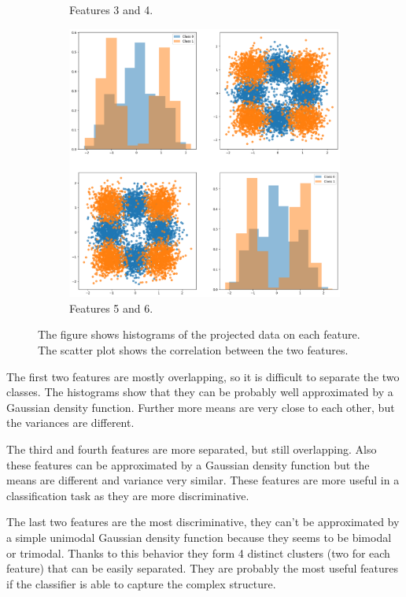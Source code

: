 \documentclass{article}
\begin{document}
\begin{figure}[ht]
\begin{subfigure}[b]{0.3\textwidth}
        \caption{Features 3 and 4.}
    \end{subfigure}
    \hfill
    \begin{subfigure}[b]{0.3\textwidth}
        \centering
        \includegraphics[width=\textwidth]{images/dataset_56.png}
        \caption{Features 5 and 6.}
    \end{subfigure}
    \caption{The figure shows histograms of the projected data on each feature. The scatter plot shows the correlation between the two features.}
    \label{fig:dataset}
\end{figure}

The first two features are mostly overlapping, so it is difficult to separate the two classes. The histograms show that they can be probably well approximated by a Gaussian density function. Further more means are very close to each other, but the variances are different. 

The third and fourth features are more separated, but still overlapping. Also these features can be approximated by a Gaussian density function but the means are different and variance very similar. These features are more useful in a classification task as they are more discriminative.

The last two features are the most discriminative, they can't be approximated by a simple unimodal Gaussian density function because they seems to be bimodal or trimodal. Thanks to this behavior they form 4 distinct clusters (two for each feature) that can be easily separated. They are probably the most useful features if the classifier is able to capture the complex structure.
\end{document}

